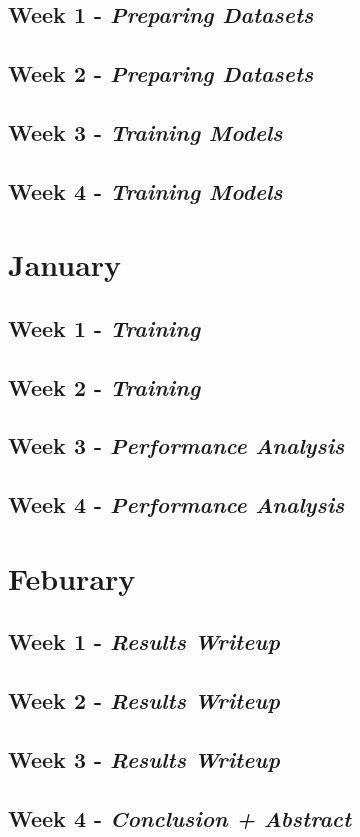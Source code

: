 \documentclass[12pt]{article}
\begin{document}
\subsection{Week 1
- \textit{Preparing Datasets}}
\subsection{Week 2
- \textit{Preparing Datasets}}
\subsection{Week 3
- \textit{Training Models}}
\subsection{Week 4
- \textit{Training Models}}


\section{January}

\subsection{Week 1
- \textit{Training}}
\subsection{Week 2
- \textit{Training}}
\subsection{Week 3
- \textit{Performance Analysis}}
\subsection{Week 4
- \textit{Performance Analysis}}

\section{Feburary}

\subsection{Week 1
- \textit{Results Writeup}}
\subsection{Week 2
- \textit{Results Writeup}}
\subsection{Week 3
- \textit{Results Writeup}}
\subsection{Week 4
- \textit{Conclusion + Abstract}}








%
%
\end{document}
